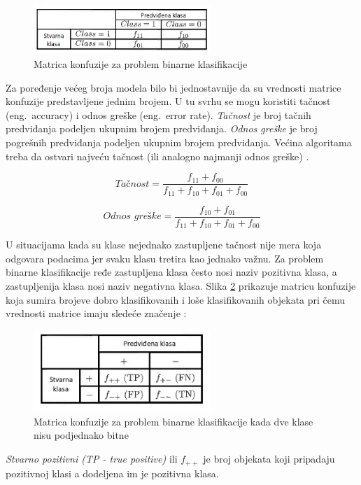 \documentclass[12pt,oneside]{memoir}
\begin{document}
\begin{figure}[!ht]
  \centering
  \includegraphics[width=0.60\textwidth]{matrica_konfuzije}
  \caption{Matrica konfuzije za problem binarne klasifikacije}
  \label{fig:matrkonf}
\end{figure}

 Za poređenje većeg broja modela bilo bi jednostavnije da su vrednosti matrice konfuzije predstavljene jednim brojem. U tu svrhu se mogu koristiti tačnost (eng.~accuracy)  i odnos greške (eng.~error rate). \textit{Tačnost} je broj tačnih predviđanja podeljen ukupnim brojem predviđanja. \textit{Odnos greške} je broj pogrešnih predviđanja podeljen ukupnim brojem predviđanja. Većina algoritama treba da ostvari najveću tačnost (ili analogno najmanji odnos greške) \cite{mitic}.

$$ \textit{Tačnost} = \frac{f_{11}+f_{00}}{f_{11}+f_{10}+f_{01}+f_{00}} $$

$$ \textit{Odnos greške} = \frac{f_{10}+f_{01}}{f_{11}+f_{10}+f_{01}+f_{00}} $$

U situacijama kada su klase nejednako zastupljene tačnost nije mera koja odgovara podacima jer svaku klasu tretira kao jednako važnu. Za problem binarne klasifikacije ređe zastupljena klasa često nosi naziv pozitivna klasa, a zastupljenija klasa nosi naziv negativna klasa. Slika \ref{fig:matrkonf2} prikazuje matricu konfuzije koja sumira brojeve dobro klasifikovanih i loše klasifikovanih objekata pri čemu vrednosti matrice imaju sledeće značenje \cite{mitic}:

\begin{figure}[!ht]
  \centering
  \includegraphics[width=0.60\textwidth]{matrica_konfuzije2}
  \caption{Matrica konfuzije za problem binarne klasifikacije kada dve klase nisu podjednako bitne}
  \label{fig:matrkonf2}
\end{figure}

\textit{Stvarno pozitivni (TP - true positive)} ili $f_{++}$ je broj objekata koji pripadaju pozitivnoj klasi a dodeljena im je pozitivna klasa.
\end{document}
